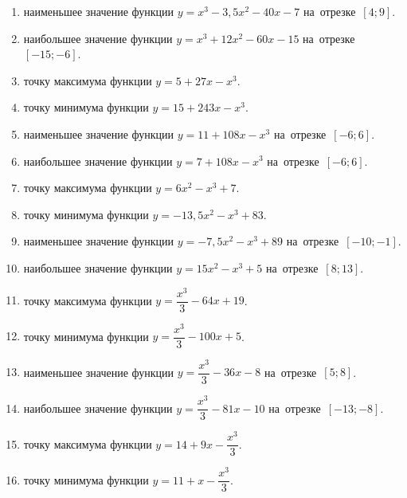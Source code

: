 \documentclass[a4paper,10pt]{article}
\begin{document}
\begin{enumerate}
\item {} наименьшее значение функции $y=x^3 -3,5x^2-40x-7$ на~отрезке~$\left[4;9\right]$.

\item {} наибольшее значение функции $y=x^3 +12x^2-60x-15$ на~отрезке~$\left[-15;-6\right]$.

\item {} точку максимума функции $y=5+27x-x^3$.

\item {} точку минимума функции $y=15+243x-x^3$.

\item {} наименьшее значение функции $y=11+108x-x^3$ на~отрезке~$\left[-6;6\right]$.

\item {} наибольшее значение функции $y=7+108x-x^3$ на~отрезке~$\left[-6;6\right]$.

\item {} точку максимума функции $y=6x^2-x^3+7$.

\item {} точку минимума функции $y=-13,5x^2-x^3+83$.

\item {} наименьшее значение функции $y=-7,5x^2-x^3+89$ на~отрезке~$\left[-10;-1\right]$.

\item {} наибольшее значение функции $y=15x^2-x^3+5$ на~отрезке~$\left[8;13\right]$.

\item {} точку максимума функции $y=\dfrac{x^3}{3} -64x+19$.

\item {} точку минимума функции $y=\dfrac{x^3}{3} -100x+5$.

\item {} наименьшее значение функции $y=\dfrac{x^3}{3} -36x-8$ на~отрезке~$\left[5;8\right]$.

\item {} наибольшее значение функции $y=\dfrac{x^3}{3} -81x-10$ на~отрезке~$\left[-13;-8\right]$.

\item {} точку максимума функции $y=14 +9x-\dfrac{x^3}{3}$.

\item {} точку минимума функции $y=11 +x-\dfrac{x^3}{3}$.


\end{enumerate}
\end{document}
